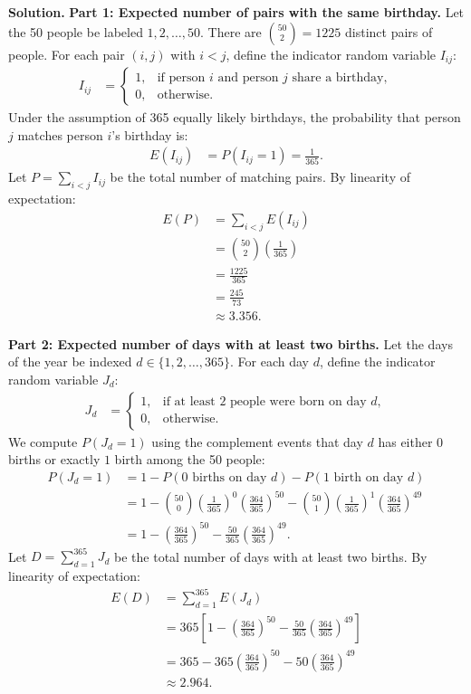 \documentclass[11pt,a4paper]{article}
\begin{document}
\noindent \textbf{Solution.} \textbf{Part 1: Expected number of pairs with the same birthday.}
Let the 50 people be labeled $1, 2, \dots, 50$. There are $\binom{50}{2} = 1225$ distinct pairs of people. For each pair $(i, j)$ with $i < j$, define the indicator random variable $I_{ij}$:
\begin{align*}
I_{ij} &= \begin{cases}
1, & \text{if person } i \text{ and person } j \text{ share a birthday}, \\
0, & \text{otherwise}.
\end{cases}
\end{align*}
Under the assumption of 365 equally likely birthdays, the probability that person $j$ matches person $i$'s birthday is:
\begin{align*}
E(I_{ij}) &= P(I_{ij} = 1) = \frac{1}{365}.
\end{align*}
Let $P = \sum_{i < j} I_{ij}$ be the total number of matching pairs. By linearity of expectation:
\begin{align*}
E(P) &= \sum_{i < j} E(I_{ij}) \\
&= \binom{50}{2} \left(\frac{1}{365}\right) \\
&= \frac{1225}{365} \\
&= \frac{245}{73} \\
&\approx 3.356.
\end{align*}

\vspace{4pt}
\noindent \textbf{Part 2: Expected number of days with at least two births.}
Let the days of the year be indexed $d \in \{1, 2, \dots, 365\}$. For each day $d$, define the indicator random variable $J_d$:
\begin{align*}
J_d &= \begin{cases}
1, & \text{if at least } 2 \text{ people were born on day } d, \\
0, & \text{otherwise}.
\end{cases}
\end{align*}
We compute $P(J_d = 1)$ using the complement events that day $d$ has either $0$ births or exactly $1$ birth among the 50 people:
\begin{align*}
P(J_d = 1) &= 1 - P(\text{0 births on day } d) - P(\text{1 birth on day } d) \\
&= 1 - \binom{50}{0} \left(\frac{1}{365}\right)^0 \left(\frac{364}{365}\right)^{50} - \binom{50}{1} \left(\frac{1}{365}\right)^1 \left(\frac{364}{365}\right)^{49} \\
&= 1 - \left(\frac{364}{365}\right)^{50} - \frac{50}{365} \left(\frac{364}{365}\right)^{49}.
\end{align*}
Let $D = \sum_{d=1}^{365} J_d$ be the total number of days with at least two births. By linearity of expectation:
\begin{align*}
E(D) &= \sum_{d=1}^{365} E(J_d) \\
&= 365 \left[ 1 - \left(\frac{364}{365}\right)^{50} - \frac{50}{365} \left(\frac{364}{365}\right)^{49} \right] \\
&= 365 - 365\left(\frac{364}{365}\right)^{50} - 50\left(\frac{364}{365}\right)^{49} \\
&\approx 2.964.
\end{align*}
\end{document}
